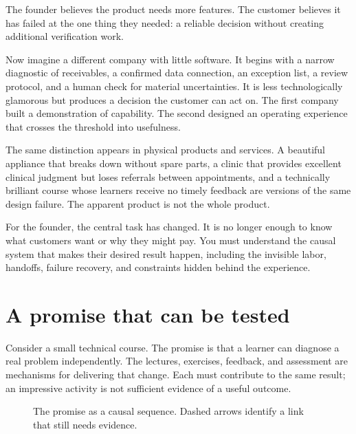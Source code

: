 \documentclass[11pt,twoside,openright]{book}
\begin{document}
The founder believes the product needs more features. The customer believes it has failed at the one thing they needed: a reliable decision without creating additional verification work.

Now imagine a different company with little software. It begins with a narrow diagnostic of receivables, a confirmed data connection, an exception list, a review protocol, and a human check for material uncertainties. It is less technologically glamorous but produces a decision the customer can act on. The first company built a demonstration of capability. The second designed an operating experience that crosses the threshold into usefulness.

The same distinction appears in physical products and services. A beautiful appliance that breaks down without spare parts, a clinic that provides excellent clinical judgment but loses referrals between appointments, and a technically brilliant course whose learners receive no timely feedback are versions of the same design failure. The apparent product is not the whole product.

For the founder, the central task has changed. It is no longer enough to know what customers want or why they might pay. You must understand the causal system that makes their desired result happen, including the invisible labor, handoffs, failure recovery, and constraints hidden behind the experience.
\section{A promise that can be tested}
Consider a small technical course. The promise is that a learner can diagnose
a real problem independently. The lectures, exercises, feedback, and assessment
are mechanisms for delivering that change. Each must contribute to the same
result; an impressive activity is not sufficient evidence of a useful outcome.

\begin{figure}[htbp]
\centering
{}
\caption{The promise as a causal sequence. Dashed arrows identify a link that still needs evidence.}
\end{figure}
\end{document}
